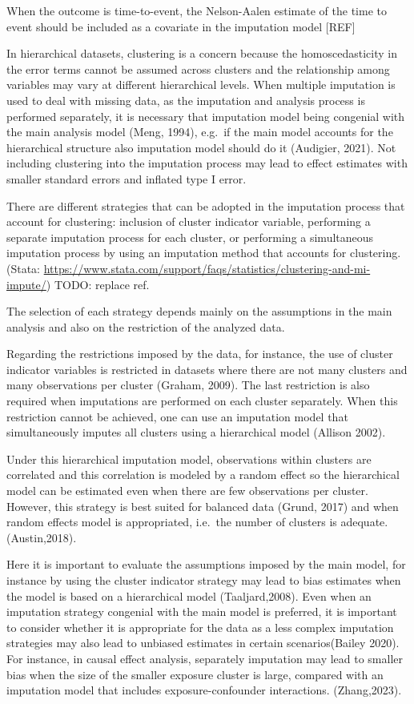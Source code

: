 \documentclass[
]{jss}
\begin{document}
When the outcome is time-to-event, the Nelson-Aalen estimate of the time
to event should be included as a covariate in the imputation model
{[}REF{]}

In hierarchical datasets, clustering is a concern because the
homoscedasticity in the error terms cannot be assumed across clusters
and the relationship among variables may vary at different hierarchical
levels. When multiple imputation is used to deal with missing data, as
the imputation and analysis process is performed separately, it is
necessary that imputation model being congenial with the main analysis
model (Meng, 1994), e.g.~if the main model accounts for the hierarchical
structure also imputation model should do it (Audigier, 2021). Not
including clustering into the imputation process may lead to effect
estimates with smaller standard errors and inflated type I error.

There are different strategies that can be adopted in the imputation
process that account for clustering: inclusion of cluster indicator
variable, performing a separate imputation process for each cluster, or
performing a simultaneous imputation process by using an imputation
method that accounts for clustering.(Stata:
\url{https://www.stata.com/support/faqs/statistics/clustering-and-mi-impute/})
TODO: replace ref.

The selection of each strategy depends mainly on the assumptions in the
main analysis and also on the restriction of the analyzed data.

Regarding the restrictions imposed by the data, for instance, the use of
cluster indicator variables is restricted in datasets where there are
not many clusters and many observations per cluster (Graham, 2009). The
last restriction is also required when imputations are performed on each
cluster separately. When this restriction cannot be achieved, one can
use an imputation model that simultaneously imputes all clusters using a
hierarchical model (Allison 2002).

Under this hierarchical imputation model, observations within clusters
are correlated and this correlation is modeled by a random effect so the
hierarchical model can be estimated even when there are few observations
per cluster. However, this strategy is best suited for balanced data
(Grund, 2017) and when random effects model is appropriated, i.e.~the
number of clusters is adequate. (Austin,2018).

Here it is important to evaluate the assumptions imposed by the main
model, for instance by using the cluster indicator strategy may lead to
bias estimates when the model is based on a hierarchical model
(Taaljard,2008). Even when an imputation strategy congenial with the
main model is preferred, it is important to consider whether it is
appropriate for the data as a less complex imputation strategies may
also lead to unbiased estimates in certain scenarios(Bailey 2020). For
instance, in causal effect analysis, separately imputation may lead to
smaller bias when the size of the smaller exposure cluster is large,
compared with an imputation model that includes exposure-confounder
interactions. (Zhang,2023).
\end{document}
